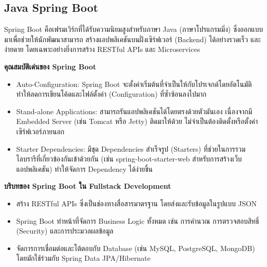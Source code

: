 \subsection{Java Spring Boot}
Spring Boot คือเฟรมเวิร์กที่ได้รับความนิยมสูงสำหรับภาษา Java (ภาษาโปรแกรมมิ่ง) ซึ่งออกแบบมาเพื่อช่วยให้นักพัฒนาสามารถ สร้างแอปพลิเคชันบนฝั่งเซิร์ฟเวอร์ (Backend) ได้อย่างรวดเร็ว และง่ายดาย โดยเฉพาะอย่างยิ่งการสร้าง RESTful APIs และ Microservices\

\textbf{คุณสมบัติเด่นของ Spring Boot}
\begin{itemize}
    \item Auto-Configuration: Spring Boot จะตั้งค่าเริ่มต้นที่จำเป็นให้กับโปรเจกต์โดยอัตโนมัติ ทำให้ลดการเขียนโค้ดและไฟล์ตั้งค่า (Configuration) ที่ซ้ำซ้อนลงไปมาก
    \item Stand-alone Applications: สามารถรันแอปพลิเคชันได้โดยตรงด้วยตัวมันเอง เนื่องจากมี Embedded Server (เช่น Tomcat หรือ Jetty) ติดมาให้ด้วย ไม่จำเป็นต้องติดตั้งหรือตั้งค่าเซิร์ฟเวอร์ภายนอก
    \item Starter Dependencies: มีชุด Dependencies สำเร็จรูป (Starters) ที่ช่วยในการรวมไลบรารีที่เกี่ยวข้องกันเข้าด้วยกัน (เช่น spring-boot-starter-web สำหรับการสร้างเว็บแอปพลิเคชัน) ทำให้จัดการ Dependency ได้ง่ายขึ้น
\end{itemize}

\textbf{บริบทของ Spring Boot ใน Fullstack Development}
\begin{itemize}
    \item สร้าง RESTful APIs ซึ่งเป็นช่องทางสื่อสารมาตรฐาน โดยส่งและรับข้อมูลในรูปแบบ JSON
    \item Spring Boot ทำหน้าที่จัดการ Business Logic ทั้งหมด เช่น การคำนวณ การตรวจสอบสิทธิ์ (Security) และการประมวลผลข้อมูล
    \item จัดการการเชื่อมต่อและโต้ตอบกับ Database (เช่น MySQL, PostgreSQL, MongoDB) โดยมักใช้ร่วมกับ Spring Data JPA/Hibernate
\end{itemize}